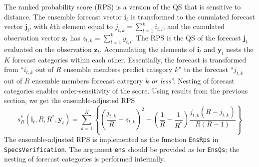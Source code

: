\documentclass[10pt]{article}\usepackage[]{graphicx}\usepackage[]{color}
\newcommand{\pkg}[1]{\texttt{#1}}
\newcommand{\code}[1]{\texttt{#1}}
\begin{document}
The ranked probability score (RPS) is a version of the QS that is sensitive to distance.
The ensemble forecast vector $\mathbf{i}_t$ is transformed to the cumulated forecast vector $\mathbf{j}_t$, with $k$th element equal to $j_{t,k} = \sum_{l=1}^k i_{t,l}$, and the cumulated observation vector $\mathbf{z}_t$ has $z_{t,k} = \sum_{l=1}^k y_{t,l}$.
The RPS is the QS of the forecast $\mathbf{j}_t$ evaluated on the observation $\mathbf{z}_t$.
Accumulating the elements of $\mathbf{i}_t$ and $\mathbf{y}_t$ nests the $K$ forecast categories within each other. 
Essentially, the forecast is transformed from ``$i_{t,k}$ out of $R$ ensemble members predict category $k$'' to the forecast ``$j_{t,k}$ out of $R$ ensemble members forecast category $k$ \emph{or less}''.
Nesting of forecast categories enables order-sensitivity of the score.
Using results from the previous section, we get the ensemble-adjusted RPS
%
\begin{equation}
s_{R}^*(\mathbf{i}_t, R, R^*, \mathbf{y}_t) = \sum_{k=1}^K \left\{ \left(\frac{j_{t,k}}{R} - z_{t,k}\right)^2 - \left(\frac{1}{R} - \frac{1}{R^*}\right) \frac{j_{t,k}(R-j_{t,k})}{R(R-1)}\right\}
\end{equation}
%
The ensemble-adjusted RPS is implemented as the function \code{EnsRps} in \pkg{SpecsVerification}.
The argument \code{ens} should be provided as for \code{EnsQs}; the nesting of forecast categories is performed internally.
\end{document}
